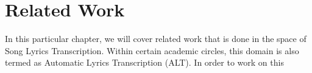 
\chapter{Related Work}
\label{sec:relatedwork}

In this particular chapter, we will cover related work that is done in the space of Song Lyrics Transcription. Within certain academic circles, this domain is also termed as Automatic Lyrics Transcription (ALT). In order to work on this
